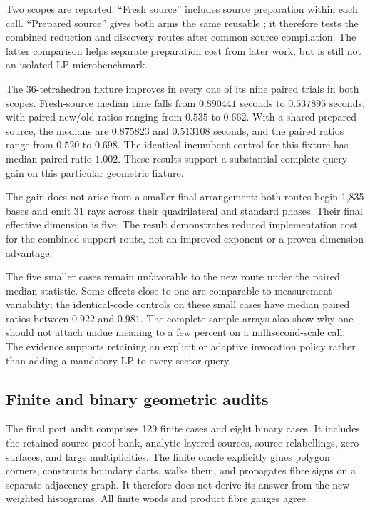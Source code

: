 Two scopes are reported. ``Fresh source'' includes source preparation
within each call. ``Prepared source'' gives both arms the same reusable
; it therefore tests the combined reduction
and discovery routes after common source compilation. The latter
comparison helps separate preparation cost from later work, but is
still not an isolated LP microbenchmark.




The 36-tetrahedron fixture improves in every one of its nine paired
trials in both scopes. Fresh-source median time falls from
\(0.890441\) seconds to \(0.537895\) seconds, with paired new/old
ratios ranging from \(0.535\) to \(0.662\). With a shared prepared
source, the medians are \(0.875823\) and \(0.513108\) seconds, and
the paired ratios range from \(0.520\) to \(0.698\).
The identical-incumbent control for this fixture has median paired
ratio \(1.002\). These results support a substantial complete-query
gain on this particular geometric fixture.

The gain does not arise from a smaller final arrangement: both routes
begin 1,835 bases and emit 31 rays across their quadrilateral and
standard phases. Their final effective dimension is five. The result
demonstrates reduced implementation cost for the combined support
route, not an improved exponent or a proven dimension advantage.

The five smaller cases remain unfavorable to the new route under the
paired median statistic. Some effects close to one are comparable to
measurement variability: the identical-code controls on these small
cases have median paired ratios between \(0.922\) and \(0.981\).
The complete sample arrays also show why one should not attach undue
meaning to a few percent on a millisecond-scale call. The evidence
supports retaining an explicit or adaptive invocation policy rather
than adding a mandatory LP to every sector query.

\subsection{Finite and binary geometric audits}

The final port audit comprises 129 finite cases and eight binary cases.
It includes the retained source proof bank, analytic layered sources,
source relabellings, zero surfaces, and large multiplicities. The finite
oracle explicitly glues polygon corners, constructs boundary darts,
walks them, and propagates fibre signs on a separate adjacency graph.
It therefore does not derive its answer from the new weighted
histograms. All finite words and product fibre gauges agree.

